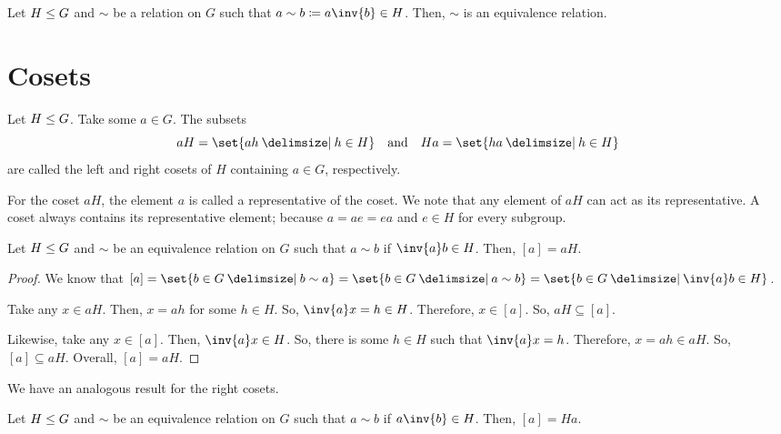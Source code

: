 \documentclass[11pt]{penrose}
\newcommand{\keyword}[1]{\textsf{#1}}
\begin{document}
\begin{nthm}
    Let $H \mathrel{\leq} G$ and $\sim$ be a relation on $G$ such that $a \sim b \coloneq a \inv{b} \in H$. Then, $\sim$ is an equivalence relation.
\end{nthm}

\section{Cosets}
\begin{ndfn}
    Let $H \mathrel{\leq} G$. Take some $a \in G$. The subsets
    \begin{equation*}
        aH = \set{ah \st h \in H}
        \quad\text{and}\quad
        Ha = \set{ha \st h \in H}
    \end{equation*}
    are called the left and right \keyword{cosets} of $H$ containing $a \in G$, respectively.
\end{ndfn}

For the coset $aH$, the element $a$ is called a \keyword{representative} of the coset. We note that any element of $aH$ can act as its representative. A coset always contains its representative element; because $a = a e = e a$ and $e \in H$ for every subgroup.

\begin{nthm}
    Let $H \mathrel{\leq} G$ and $\sim$ be an equivalence relation on $G$ such that $a \sim b$ if $\inv{a} b \in H$. Then, $[a] = aH$.
\end{nthm}
\begin{proof}
    We know that $[a] = \set{b \in G \st b \sim a} = \set{b \in G \st a \sim b} = \set{b \in G \st \inv{a} b \in H}$.

    Take any $x \in aH$. Then, $x = ah$ for some $h \in H$. So, $\inv{a} x = h \in H$. Therefore, $x \in [a]$. So, $aH \subseteq [a]$.

    Likewise, take any $x \in [a]$. Then, $\inv{a} x \in H$. So, there is some $h \in H$ such that $\inv{a} x = h$. Therefore, $x = ah \in aH$. So, $[a] \subseteq aH$. Overall, $[a] = aH$.
\end{proof}

We have an analogous result for the right cosets.
\begin{nthm}
    Let $H \mathrel{\leq} G$ and $\sim$ be an equivalence relation on $G$ such that $a \sim b$ if $a \inv{b} \in H$. Then, $[a] = Ha$.
\end{nthm}
\end{document}
